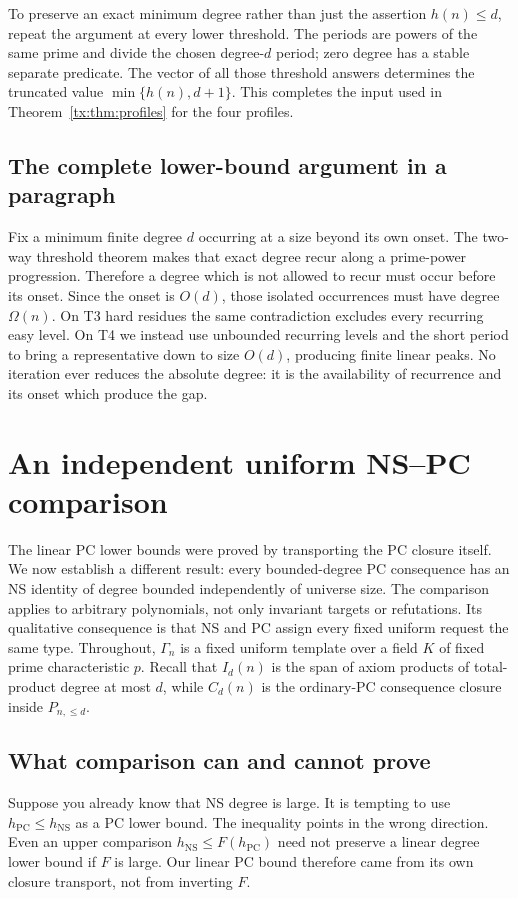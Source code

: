 \documentclass[11pt,a4paper,oneside,openany]{book}
\theoremstyle{definition}\newtheorem{definition}[theorem]{Definition}
\theoremstyle{remark}\newtheorem{remark}[theorem]{Remark}
\newcommand{\NS}{\mathrm{NS}}\newcommand{\PC}{\mathrm{PC}}
\numberwithin{equation}{chapter}
\begin{document}
To preserve an exact minimum degree rather than just the assertion
$h(n)\le d$, repeat the argument at every lower threshold. The periods
are powers of the same prime and divide the chosen degree-$d$ period;
zero degree has a stable separate predicate. The vector of all those
threshold answers determines the truncated value
$\min\{h(n),d+1\}$. This completes the input used in
Theorem~\ref{tx:thm:profiles} for the four profiles.

\section{The complete lower-bound argument in a paragraph}
Fix a minimum finite degree $d$ occurring at a size beyond its own onset.
The two-way threshold theorem makes that exact degree recur along a
prime-power progression. Therefore a degree which is not allowed to recur
must occur before its onset. Since the onset is $O(d)$, those isolated
occurrences must have degree $\Omega(n)$. On T3 hard residues the same
contradiction excludes every recurring easy level. On T4 we instead use
unbounded recurring levels and the short period to bring a representative
down to size $O(d)$, producing finite linear peaks. No iteration ever
reduces the absolute degree: it is the availability of recurrence and
its onset which produce the gap.

\chapter{An independent uniform NS--PC comparison}\label{tx:sec:comparison}
The linear PC lower bounds were proved by transporting the PC closure
itself. We now establish a different result: every bounded-degree PC
consequence has an NS identity of degree bounded independently of
universe size. The comparison applies to arbitrary polynomials, not
only invariant targets or refutations. Its qualitative consequence is
that NS and PC assign every fixed uniform request the same type.
Throughout, $\Gamma_n$ is a fixed uniform template over a field $K$
of fixed prime characteristic $p$. Recall that $I_d(n)$ is the span of
axiom products of total-product degree at most $d$, while $C_d(n)$ is
the ordinary-PC consequence closure inside $P_{n,\le d}$.

\section{What comparison can and cannot prove}
Suppose you already know that NS degree is large. It is tempting to use
$h_{\PC}\le h_{\NS}$ as a PC lower bound. The inequality points in the
wrong direction. Even an upper comparison $h_{\NS}\le F(h_{\PC})$
need not preserve a linear degree lower bound if $F$ is large. Our linear PC bound
therefore came from its own closure transport, not from inverting $F$.
\end{document}
